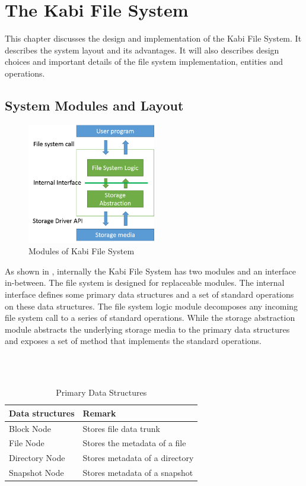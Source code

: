 \chapter{The Kabi File System}
\label{chap:fs}

    This chapter discusses the design and implementation of the Kabi File System. It describes the system layout and its advantages. It will also describes design choices and important details of the file system implementation, entities and operations.

\section{System Modules and Layout}

\begin{figure}[t]
\centering
\includegraphics[width=0.5\textwidth]{Chapter-3/figs/fig8.png}
\caption{Modules of Kabi File System}
\label{fig:modules}
\end{figure}

    As shown in , internally the Kabi File System has two modules and an interface in-between. The file system is designed for replaceable modules. The internal interface defines some primary data structures and a set of standard operations on these data structures. The file system logic module decomposes any incoming file system call to a series of standard operations.
	While the storage abstraction module abstracts the underlying storage media to the primary data structures and exposes a set of method that implements the standard operations.

\begin{table}[t]
\begin{center}
~\\
~\\
\caption{Primary Data Structures}
\begin{tabular}{ll}
\toprule
Data structures & Remark\\
\midrule
Block Node & Stores file data trunk\\
File Node & Stores the metadata of a file\\
Directory Node & Stores metadata of a directory \\
Snapshot Node & Stores metadata of a snapshot\\
\bottomrule
\end{tabular}
\end{center}
\label{tab:data_struct}
\end{table}


